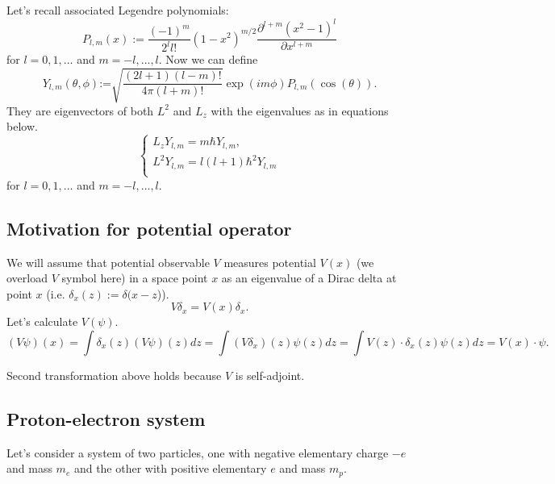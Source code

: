 \documentclass[main.tex]{subfiles}
\begin{document}
Let's recall associated Legendre polynomials:
\begin{equation}
P_{l,m}(x):=\frac{(-1)^m}{2^l l!} \left(1-x^2\right)^{m/2} \frac{\partial ^{l+m}\left(x^2-1\right)^l}{\partial x^{l+m}}
\end{equation}
for $l=0, 1, \dots$ and $m=-l,\dots, l$.
Now we can define
\begin{equation}
Y_{l,m}(\theta ,\phi )\text{:=}\sqrt{\frac{(2 l+1) (l-m)!}{4 \pi  (l+m)!}} \exp (i m \phi ) P_{l,m}(\cos (\theta )).
\end{equation}
They are eigenvectors of both $L^2$ and $L_z$ with the eigenvalues as in equations below.
\begin{equation}
\boxed{
\begin{cases}
L_z Y_{l,m} = m\hbar Y_{l,m},\\
L^2 Y_{l,m} = l(l+1)\hbar^2 Y_{l,m}\\
\end{cases}
}
\end{equation}
for $l=0, 1, \dots$ and $m=-l,\dots, l$.
\subsection{Motivation for potential operator}

We will assume that potential observable $V$ measures
potential $V(x)$ (we overload $V$ symbol here) in a space point $x$ as an eigenvalue of a Dirac delta at point $x$ (i.e. $\delta_x(z):=\delta(x - z$)).
\begin{equation}
V\delta_x = V(x)\delta_x.
\end{equation}
Let's calculate $V(\psi)$.
\begin{equation}
(V\psi)(x) = \int \delta_x(z) (V\psi)(z)dz = \int (V\delta_x)(z)\psi(z)dz = \int V(z)\cdot \delta_x(z)\psi(z)dz = V(x)\cdot \psi. 
\end{equation}

Second transformation above holds because $V$ is self-adjoint.

\subsection{Proton-electron system}
Let's consider a system of two particles, one with negative elementary charge $-e$ and mass $m_e$ and the other with positive elementary $e$ and mass $m_p$.
\end{document}
